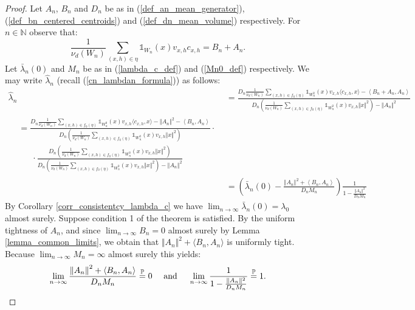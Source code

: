 \documentclass{article}
\newcommand{\NN}{\mathbb{N}}
\newcommand{\PP}{\mathbb{P}}
\theoremstyle{plain}
\theoremstyle{remark}
\theoremstyle{definition}
\begin{document}
\begin{proof}
Let $A_n$, $B_n$ and $D_n$ be as in (\ref{def_an_mean_generator}), (\ref{def_bn_centered_centroids}) and (\ref{def_dn_mean_volume}) respectively. For $n \in \NN$ observe that:
\[\frac{1}{\nu_d(W_n)}\sum_{(x,h) \in \eta} \mathds{1}_{W_n}(x)v_{x,h} c_{x,h} = B_n + A_n.\]
Let $\bar{\lambda}_n(0)$ and $M_n$ be as in (\ref{lambda_c_def}) and (\ref{Mn0_def}) respectively. We may write $\hat{\lambda}_n$ (recall (\ref{cn_lambdan_formula})) as follows:
{\allowdisplaybreaks
\begin{align*}
        \hat{\lambda}_n &= \frac{D_n \frac{1}{\nu_d(W_n)}\sum_{(x,h) \in f_0(\eta)} \mathds{1}_{W_n^0}(x)v_{x,h}\langle c_{x,h},x\rangle - \left\langle B_n+A_n,A_n \right\rangle}{D_n \left(\frac{1}{\nu_d(W_n)}\sum_{(x,h) \in f_0(\eta)} \mathds{1}_{W_n^0}(x)v_{x,h}\Vert x \Vert^2 \right) - \left\Vert A_n \right\Vert^2} \\
        \begin{split}
            &= \frac{D_n \frac{1}{\nu_d(W_n)}\sum_{(x,h) \in f_0(\eta)} \mathds{1}_{W_n^0}(x)v_{x,h}\langle c_{x,h},x\rangle - \left\Vert A_n \right\Vert^2 -  \left\langle B_n,A_n \right\rangle}{D_n \left(\frac{1}{\nu_d(W_n)}\sum_{(x,h) \in f_0(\eta)} \mathds{1}_{W_n^0}(x)v_{x,h}\Vert x \Vert^2 \right) }\cdot \\
            &\phantom{=} \ \cdot\frac{D_n \left(\frac{1}{\nu_d(W_n)}\sum_{(x,h) \in f_0(\eta)} \mathds{1}_{W_n^0}(x)v_{x,h}\Vert x \Vert^2 \right) }{D_n \left(\frac{1}{\nu_d(W_n)}\sum_{(x,h) \in f_0(\eta)} \mathds{1}_{W_n^0}(x)v_{x,h}\Vert x \Vert^2 \right) - \left\Vert A_n \right\Vert^2}
        \end{split}\\
        &=\left( \bar{\lambda}_n(0) - \frac{\left\Vert A_n \right\Vert^2 +  \left\langle B_n,A_n \right\rangle}{D_n M_n}\right) \frac{1}{1 - \frac{\Vert A_n \Vert^2}{D_nM_n}}
    \end{align*}
}%
By Corollary \ref{corr_consistentcy_lambda_c} we have $\lim_{n \to \infty}\bar{\lambda}_n(0)=\lambda_0$ almost surely. Suppose condition 1 of the theorem is satisfied. By the uniform tightness of $A_n$, and since $\lim_{n \to \infty}B_n=0$ almost surely by Lemma \ref{lemma_common_limits}, we obtain that $\Vert A_n \Vert^2 +\langle B_n,A_n\rangle$ is uniformly tight. Because $\lim_{n \to \infty} M_n = \infty$ almost surely this yields:
\begin{equation}
    \lim_{n \to \infty}\frac{\left\Vert A_n \right\Vert^2 +  \left\langle B_n,A_n \right\rangle}{D_n M_n} \overset{\PP}{=}0 \text{ \quad and \quad } \lim_{n \to \infty}\frac{1}{1 - \frac{\Vert A_n \Vert^2}{D_nM_n}}\overset{\PP}{=}1.\label{consistency_lambdan_intermediate_limits}

\end{equation}
\end{proof}
\end{document}
